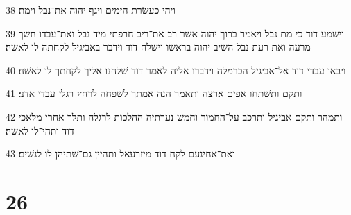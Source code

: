 \par 38 ויהי כעשׂרת הימים ויגף יהוה את־נבל וימת׃
\par 39 וישׁמע דוד כי מת נבל ויאמר ברוך יהוה אשׁר רב את־ריב חרפתי מיד נבל ואת־עבדו חשׂך מרעה ואת רעת נבל השׁיב יהוה בראשׁו וישׁלח דוד וידבר באביגיל לקחתה לו לאשׁה׃
\par 40 ויבאו עבדי דוד אל־אביגיל הכרמלה וידברו אליה לאמר דוד שׁלחנו אליך לקחתך לו לאשׁה׃
\par 41 ותקם ותשׁתחו אפים ארצה ותאמר הנה אמתך לשׁפחה לרחץ רגלי עבדי אדני׃
\par 42 ותמהר ותקם אביגיל ותרכב על־החמור וחמשׁ נערתיה ההלכות לרגלה ותלך אחרי מלאכי דוד ותהי־לו לאשׁה׃
\par 43 ואת־אחינעם לקח דוד מיזרעאל ותהיין גם־שׁתיהן לו לנשׁים׃

\chapter{26}

